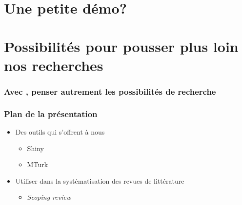 \documentclass{beamer}
\begin{document}
 \section{Une petite démo?}



\section{Possibilités pour pousser plus loin nos recherches}


    \begin{frame}
    
        \frametitle{Avec \R, penser autrement les possibilités de recherche} \vspace{1cm}
    
    \end{frame}



    \begin{frame}
    
        \frametitle{Plan de la présentation} \vspace{1cm}
        
        \begin{itemize}
        
        \item{Des outils qui s'offrent à nous}
         
          \begin{itemize}
            \item{Shiny}
	    \item{MTurk}
          \end{itemize}
	  
	  
         \item{Utiliser \R dans la systématisation des revues de littérature}
        
          \begin{itemize}
            \item{\emph{Scoping review}}
          \end{itemize}         
        \end{itemize}
        
    \end{frame}

\end{document}

